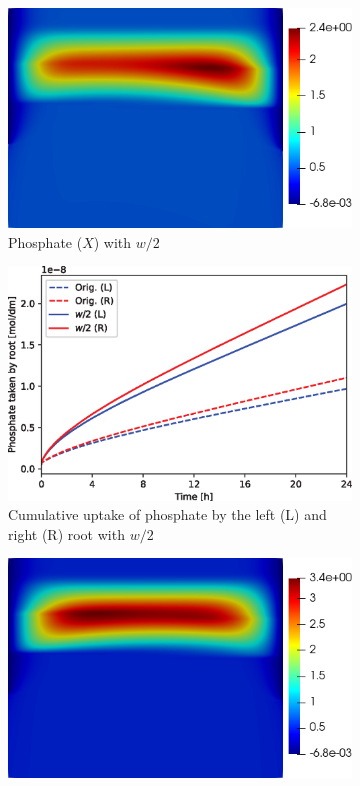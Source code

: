 \documentclass[11pt]{article}
\numberwithin{equation}{section}
\begin{document}
\begin{figure}[!htb]
\centering
\begin{subfigure}[t]{0.35\textwidth}
    \includegraphics[trim= 100 100 60 100,width=\textwidth]{Figures/X_wdivby2.png}
    \caption{Phosphate ($X$) with $w/2$}
    \label{fig:numexp_w1}
\end{subfigure}
\hspace{1cm}
\begin{subfigure}[t]{0.4\textwidth}
    \includegraphics[width=\textwidth]{Figures/wdivby2.eps}
    \caption{Cumulative uptake of phosphate by the left (L) and right (R) root with $w/2$}
    \label{fig:numexp_w2}
\end{subfigure}
\qquad
\begin{subfigure}[t]{0.35\textwidth}
    \includegraphics[trim= 100 100 60 100,width=\textwidth]{Figures/X_F11times10wdivby2.png}

\end{subfigure}
\end{figure}
\end{document}
